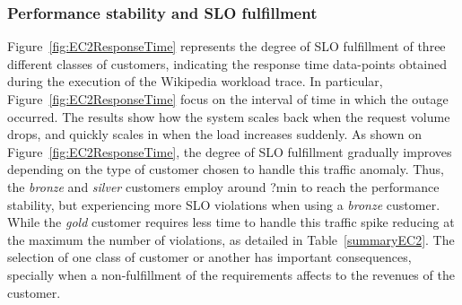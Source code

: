 \subsubsection{Performance stability and SLO fulfillment} 
Figure~\ref{fig:EC2ResponseTime} represents the degree of SLO fulfillment of three different classes of customers, indicating the response time data-points obtained during the execution of the Wikipedia workload trace. In particular, Figure~\ref{fig:EC2ResponseTime} focus on the interval of time in which the outage occurred. The results show how the system scales back when the request volume drops, and quickly scales in when the load increases suddenly. As shown on Figure~\ref{fig:EC2ResponseTime},  the degree of SLO fulfillment gradually improves depending on the type of customer chosen to handle this traffic anomaly. Thus, the \emph{bronze} and \emph{silver} customers employ around ?min to reach the performance stability,  but experiencing more SLO violations when using a \emph{bronze} customer. While the \emph{gold} customer requires less time to handle this traffic spike reducing at the maximum the number of violations, as detailed in Table~\ref{summaryEC2}. The selection of one class of customer or another has important consequences, specially when a non-fulfillment of the requirements affects to the revenues of the customer.

